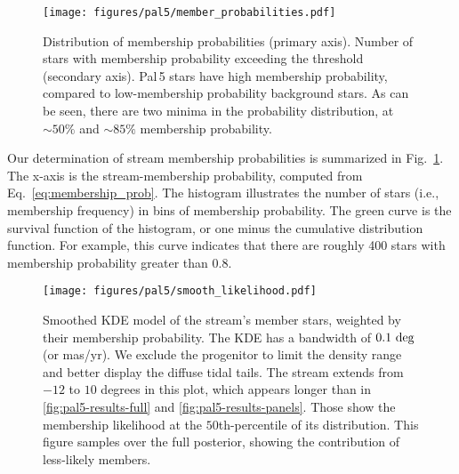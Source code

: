 \documentclass[twocolumn, linenumbers]{aastex631}
\newcommand{\stream}[1]{#1}
\begin{document}
        \begin{figure}[htp]
            \centering
            \texttt{[image: figures/pal5/member\_probabilities.pdf]}
            \caption{%
                Distribution of membership probabilities (primary axis).
                Number of stars with membership probability exceeding the threshold (secondary axis).
                \stream{Pal\,5} stars have high membership probability, compared to low-membership probability background stars. As can be seen, there are two minima in the probability distribution, at $\sim 50\%$ and $\sim 85\%$ membership probability.
            }
            \label{fig:pal5-member_probs}
        \end{figure}
        
        Our determination of stream membership probabilities is summarized in Fig.~\ref{fig:pal5-member_probs}. The x-axis is the stream-membership probability, computed from Eq.~\ref{eq:membership_prob}. The histogram illustrates the number of stars (i.e., membership frequency) in bins of membership probability. The green curve is the survival function of the histogram, or one minus the cumulative distribution function. For example, this curve indicates that there are roughly 400 stars with membership probability greater than $0.8$.

        \begin{figure}[htp]
            \centering
            \hspace{-25pt}\texttt{[image: figures/pal5/smooth\_likelihood.pdf]}
            \caption{%
                Smoothed KDE model of the stream's member stars, weighted by
                their membership probability. The KDE has a bandwidth of $0.1 \
                \rm{deg}$ (or mas/yr). We exclude the progenitor to limit the
                density range and better display the diffuse tidal tails. The
                stream extends from $-12$ to $10$ degrees in this plot, which
                appears longer than in \autoref{fig:pal5-results-full} and
                \autoref{fig:pal5-results-panels}. Those show the membership
                likelihood at the $50$th-percentile of its distribution. This
                figure samples over the full posterior, showing the contribution
                of less-likely members.
            }
            \label{fig:pal5-heatmap}
        \end{figure}
\end{document}
